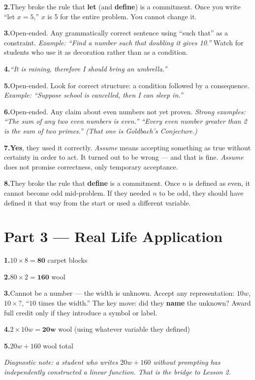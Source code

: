 \documentclass[12pt]{article}
\begin{document}
\textbf{2.}\quad They broke the rule that \textbf{let} (and \textbf{define}) is a commitment.
Once you write ``let $x = 5$,'' $x$ is 5 for the entire problem. You cannot change it.

\textbf{3.}\quad Open-ended. Any grammatically correct sentence using ``such that'' as a constraint.
\textit{Example: ``Find a number such that doubling it gives 10.''} 
Watch for students who use it as decoration rather than as a condition.

\textbf{4.}\quad \textit{``It is raining, therefore I should bring an umbrella.''}

\textbf{5.}\quad Open-ended. Look for correct structure: a condition followed by a consequence.
\textit{Example: ``Suppose school is cancelled, then I can sleep in.''}

\textbf{6.}\quad Open-ended. Any claim about even numbers not yet proven.
\textit{Strong examples: ``The sum of any two even numbers is even.''
``Every even number greater than 2 is the sum of two primes.'' (That one is Goldbach's Conjecture.)}

\textbf{7.}\quad \textbf{Yes}, they used it correctly.
\textit{Assume} means accepting something as true without certainty in order to act.
It turned out to be wrong --- and that is fine. \textit{Assume} does not promise correctness, only temporary acceptance.

\textbf{8.}\quad They broke the rule that \textbf{define} is a commitment.
Once $n$ is defined as even, it cannot become odd mid-problem.
If they needed $n$ to be odd, they should have defined it that way from the start or used a different variable.

\section*{Part 3 --- Real Life Application}

\textbf{1.}\quad $10 \times 8 = \mathbf{80}$ carpet blocks

\textbf{2.}\quad $80 \times 2 = \mathbf{160}$ wool

\textbf{3.}\quad Cannot be a number --- the width is unknown.
Accept any representation: $10w$, $10 \times ?$, ``$10$ times the width.''
The key move: did they \textbf{name} the unknown? Award full credit only if they introduce a symbol or label.

\textbf{4.}\quad $2 \times 10w = \mathbf{20w}$ wool (using whatever variable they defined)

\textbf{5.}\quad $20w + 160$ wool total

\textit{Diagnostic note: a student who writes $20w + 160$ without prompting
has independently constructed a linear function. That is the bridge to Lesson 2.}
\end{document}
